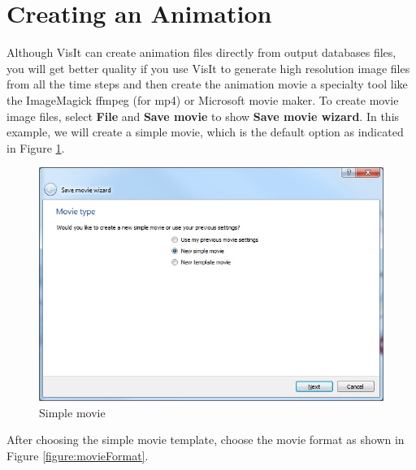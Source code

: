 \documentclass[12pt]{report}
\begin{document}
				\section{Creating an Animation }
				
				Although VisIt can create animation files directly from output databases files, you will get better quality
				if you use VisIt to generate high resolution image files from all the time steps and then create the animation movie 
				a specialty tool like the ImageMagick ffmpeg (for mp4) or Microsoft movie maker. To create movie image files,
				select {\bf File} and {\bf Save movie} to show {\bf Save movie wizard}. In this example, we will
				create a simple movie, which is the default option as indicated in Figure \ref{figure:movieWizardSimple}. 
				
				\begin{figure}
        \begin{center}
        \includegraphics[scale=0.75]{movieWizardSimple}
        \caption{Simple movie}
        \label{figure:movieWizardSimple}
        \end{center}
        \end{figure}
				
				After choosing the simple movie template, choose the movie format as shown in Figure \ref{figure:movieFormat}.
				
\end{document}
